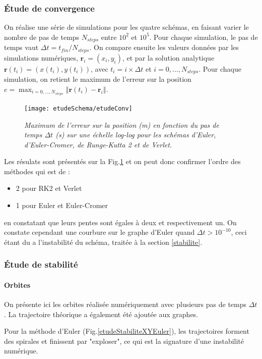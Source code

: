 \documentclass[a4paper,12pt,oneside]{article}
\newcommand{\norme}[1]{\left\Vert #1 \right\Vert}
\begin{document}
\subsubsection{Étude de convergence}
On réalise une série de simulations pour les quatre schémas, en faisant varier le nombre de pas de temps $N_{steps}$ entre $10^2$ et $10^5$. Pour chaque simulation, le pas de temps vaut $\Delta t = t_{fin}/N_{steps}$. On compare ensuite les valeurs données par les simulations numériques, $\textbf{r}_i=(x_i,y_i)$, et par la solution analytique $\textbf{r}(t_i)=(x(t_i),y(t_i))$, avec $t_i=i \times \Delta t$ et $i=0,...,N_{steps}$. Pour chaque simulation, on retient le maximum de l'erreur sur la position $e=\max_{i=0,...,N_{steps}} \norme{\textbf{r} (t_i) - \textbf{r}_i}$.

\begin{figure}[h]
\centerline{\texttt{[image: etudeSchema/etudeConv]}}
\caption{ \label{etudeConv}\em
 Maximum de l'erreur sur la position (m) en fonction du pas de temps $\Delta t$ (s) sur une échelle log-log pour les schémas d'Euler, d'Euler-Cromer, de Runge-Kutta 2 et de Verlet.
}
\end{figure}

Les résulats sont présentés sur la Fig.\ref{etudeConv} et on peut donc confirmer l'ordre des méthodes qui est de : 
\begin{itemize}
    \item 2 pour RK2 et Verlet
    \item 1 pour Euler et Euler-Cromer
\end{itemize} 
en constatant que leurs pentes sont égales à deux et respectivement un. On constate cependant une courbure sur le graphe d'Euler quand $\Delta t >10^{-10}$, ceci étant du a l'instabilité du schéma, traitée à la section \ref{stabilite}.


\subsubsection{Étude de stabilité \label{stabilite}}
\paragraph{Orbites}
On présente ici les orbites réalisée numériquement avec plusieurs pas de temps $\Delta t$. La trajectoire théorique a également été ajoutée aux graphes.

Pour la méthode d'Euler (Fig.\ref{etudeStabiliteXYEuler}), les trajectoires forment des spirales et finissent par "exploser", ce qui est la signature d'une instabilité numérique.
\end{document}
